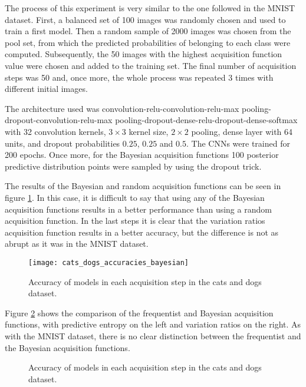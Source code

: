 The process of this experiment is very similar to the one followed in the MNIST dataset. First, a balanced set of 100 images was randomly chosen and used to train a first model. Then a random sample of 2000 images was chosen from the pool set, from which the predicted probabilities of belonging to each class were computed. Subsequently, the 50 images with the highest acquisition function value were chosen and added to the training set. The final number of acquisition steps was 50 and, once more, the whole process was repeated 3 times with different initial images.

The architecture used was convolution-relu-convolution-relu-max pooling-dropout-convolution-relu-max pooling-dropout-dense-relu-dropout-dense-softmax with 32 convolution kernels, $3 \times 3$ kernel size, $2 \times 2$ pooling, dense layer with 64 units, and dropout probabilities $0.25$, $0.25$ and $0.5$. The CNNs were trained for 200 epochs. Once more, for the Bayesian acquisition functions 100 posterior predictive distribution points were sampled by using the dropout trick.

The results of the Bayesian and random acquisition functions can be seen in figure \ref{fig:cats_dogs_accuracies_bayesian}. In this case, it is difficult to say that using any of the Bayesian acquisition functions results in a better performance than using a random acquisition function. In the last steps it is clear that the variation ratios acquisition function results in a better accuracy, but the difference is not as abrupt as it was in the MNIST dataset.

\begin{figure}[H]
    \centering
    \texttt{[image: cats\_dogs\_accuracies\_bayesian]}
    \caption{Accuracy of models in each acquisition step in the cats and dogs dataset.}
    \label{fig:cats_dogs_accuracies_bayesian}
\end{figure}

Figure \ref{fig:cats_dogs_bayesian_vs_freq} shows the comparison of the frequentist and Bayesian acquisition functions, with predictive entropy on the left and variation ratios on the right. As with the MNIST dataset, there is no clear distinction between the frequentist and the Bayesian acquisition functions.

\begin{figure}[H]
    \centering
    \hfill
    \caption{Accuracy of models in each acquisition step in the cats and dogs dataset.}
    \label{fig:cats_dogs_bayesian_vs_freq}
\end{figure}




